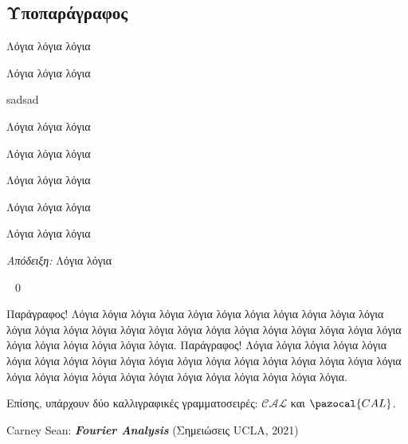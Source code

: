 \subsection{Υποπαράγραφος}

\begin{exercise} %
Λόγια λόγια λόγια
\end{exercise}

\begin{theorem} %
Λόγια λόγια λόγια
\end{theorem}
sadsad
\begin{lemma} %
Λόγια λόγια λόγια
\end{lemma}

\begin{definition} %
Λόγια λόγια λόγια
\end{definition}

\begin{remark} %
Λόγια λόγια λόγια
\end{remark}

\begin{corollary} %
Λόγια λόγια λόγια
\end{corollary}

\begin{proposition} %
Λόγια λόγια λόγια
\end{proposition}

\emph{Απόδειξη:} Λόγια λόγια

~\hfill\qed\par

Παράγραφος! Λόγια λόγια λόγια λόγια λόγια λόγια λόγια λόγια λόγια λόγια λόγια λόγια λόγια λόγια λόγια λόγια λόγια λόγια λόγια λόγια λόγια λόγια λόγια λόγια λόγια λόγια λόγια λόγια λόγια λόγια λόγια.
Παράγραφος! Λόγια λόγια λόγια λόγια λόγια λόγια λόγια λόγια λόγια λόγια λόγια λόγια λόγια λόγια λόγια λόγια λόγια λόγια λόγια λόγια λόγια λόγια λόγια λόγια λόγια λόγια λόγια λόγια λόγια λόγια λόγια. %

Επίσης, υπάρχουν δύο καλλιγραφικές γραμματοσειρές: $\mathcal{CAL}$ και $\pazocal{CAL}$.

\begin{thebibliography}{9}
 Carney Sean: \emph{\textbf{Fourier Analysis}} (Σημειώσεις UCLA, 2021)
\end{thebibliography}

